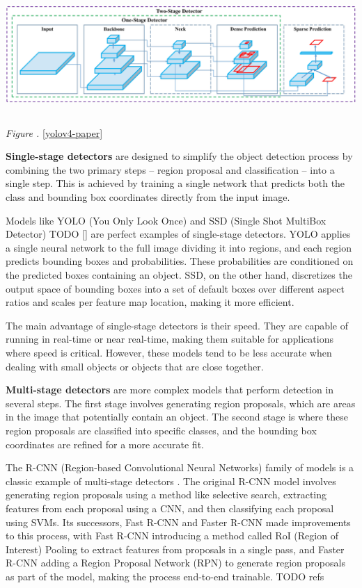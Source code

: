 \documentclass[14pt,a4paper]{extarticle}
\newcounter{e}
\newcounter{pic}
\newcommand{\pic}[1]{\refstepcounter{pic} \vspace{-0.3cm}\textit{Figure \arabic{pic}\label{#1}.}}
\newcounter{tabl}
\numberwithin{equation}{section}
\numberwithin{figure}{section}
\begin{document}
\begin{center}
    \includegraphics[height=4.5cm]{images/architecture.png}
\end{center}
\begin{center}
    \pic{yolov4-architecture} \ref{yolov4-paper}
\end{center}

\textbf{Single-stage detectors} are designed to simplify the object detection process by combining the two primary steps -- region proposal and classification -- into a single step. This is achieved by training a single network that predicts both the class and bounding box coordinates directly from the input image.

Models like YOLO (You Only Look Once) and SSD (Single Shot MultiBox Detector) TODO \ref{} are perfect examples of single-stage detectors. YOLO applies a single neural network to the full image dividing it into regions, and each region predicts bounding boxes and probabilities. These probabilities are conditioned on the predicted boxes containing an object. SSD, on the other hand, discretizes the output space of bounding boxes into a set of default boxes over different aspect ratios and scales per feature map location, making it more efficient.

The main advantage of single-stage detectors is their speed. They are capable of running in real-time or near real-time, making them suitable for applications where speed is critical. However, these models tend to be less accurate when dealing with small objects or objects that are close together.

\textbf{Multi-stage detectors} are more complex models that perform detection in several steps. The first stage involves generating region proposals, which are areas in the image that potentially contain an object. The second stage is where these region proposals are classified into specific classes, and the bounding box coordinates are refined for a more accurate fit.

The R-CNN (Region-based Convolutional Neural Networks) family of models is a classic example of multi-stage detectors \cite{r-cnn}. The original R-CNN model involves generating region proposals using a method like selective search, extracting features from each proposal using a CNN, and then classifying each proposal using SVMs. Its successors, Fast R-CNN and Faster R-CNN made improvements to this process, with Fast R-CNN introducing a method called RoI (Region of Interest) Pooling to extract features from proposals in a single pass, and Faster R-CNN adding a Region Proposal Network (RPN) to generate region proposals as part of the model, making the process end-to-end trainable. TODO refs
\end{document}
